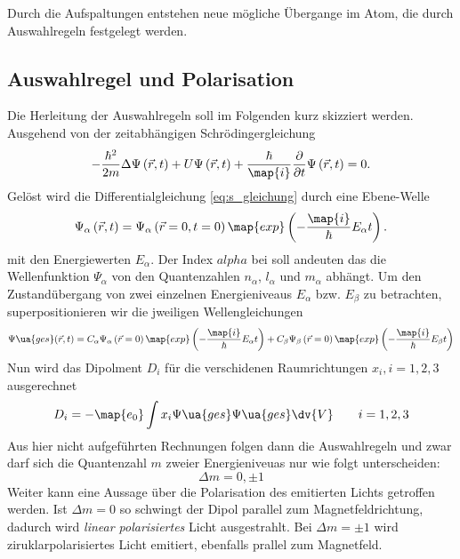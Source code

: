 Durch die Aufspaltungen entstehen neue mögliche Übergange im Atom, die durch Auswahlregeln festgelegt werden.

\subsection{Auswahlregel und Polarisation}
Die Herleitung der Auswahlregeln soll im Folgenden kurz skizziert werden.
Ausgehend von der zeitabhängigen Schrödingergleichung
\begin{equation}
  \label{eq:s_gleichung}
  -\frac{\hbar^2}{2m}\Delta \Psi\left(\vec{r},t\right) + U  \Psi\left(\vec{r},t\right) + \frac{\hbar}{\map{i}} \frac{\partial}{\partial t}  \Psi\left(\vec{r},t\right)=0.
\end{equation}
Gelöst wird die Differentialgleichung \eqref{eq:s_gleichung} durch eine Ebene-Welle
\begin{equation*}
  \Psi_{\alpha}\left(\vec{r},t\right)=\Psi_{\alpha}\left(\vec{r}=0,t=0\right)\map{exp}\left(-\frac{\map{i}}{\hbar}E_\alpha t\right).
\end{equation*}
mit den Energiewerten $E_\alpha$. Der Index $alpha$ bei soll andeuten das die Wellenfunktion
$\Psi_\alpha$ von den Quantenzahlen $n_\alpha$, $l_\alpha$ und $m_\alpha$ abhängt.
Um den Zustandübergang von zwei einzelnen Energieniveaus $E_\alpha$ bzw. $E_\beta$ zu betrachten,
superpositionieren wir die jweiligen Wellengleichungen
\begin{equation*}
    \Psi\ua{ges}(\vec{r},t)=C_\alpha\Psi_{\alpha}\left(\vec{r}=0\right)\map{exp}\left(-\frac{\map{i}}{\hbar}E_\alpha t\right)+C_\beta\Psi_{\beta}\left(\vec{r}=0\right)\map{exp}\left(-\frac{\map{i}}{\hbar}E_\beta t\right)
\end{equation*}
Nun wird das Dipolment $D_i$ für die verschidenen Raumrichtungen $x_i, i=1,2,3$ ausgerechnet
\begin{equation*}
  D_i=-\map{e_0}\int x_i \Psi\*\ua{ges}\Psi\ua{ges} \dv{V} \qquad i=1,2,3
\end{equation*}
Aus hier nicht aufgeführten Rechnungen folgen dann die Auswahlregeln und zwar darf sich die Quantenzahl $m$ zweier Energieniveuas
nur wie folgt unterscheiden:
\begin{equation}
  \label{eq:auswahlregeln}
  \Delta m=0 , \pm 1
\end{equation}
Weiter kann eine Aussage über die Polarisation des emitierten Lichts getroffen werden.
Ist $\Delta m=0$ so schwingt der Dipol parallel zum Magnetfeldrichtung, dadurch wird \emph{linear polarisiertes} Licht
ausgestrahlt. Bei $\Delta m=\pm 1$ wird ziruklarpolarisiertes Licht emitiert, ebenfalls prallel zum Magnetfeld.


